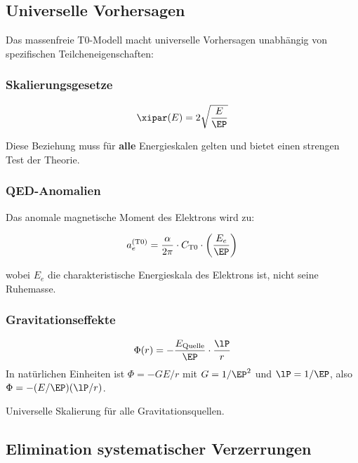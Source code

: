 	\subsection{Universelle Vorhersagen}
	\label{subsec:universal_predictions}
	
	Das massenfreie T0-Modell macht universelle Vorhersagen unabhängig von spezifischen Teilcheneigenschaften:
	
	\subsubsection{Skalierungsgesetze}
	
	\begin{equation}
		\xipar(E) = 2\sqrt{\frac{E}{\EP}}
		\label{eq:universal_scaling}
	\end{equation}
	
	Diese Beziehung muss für \textbf{alle} Energieskalen gelten und bietet einen strengen Test der Theorie.
	
	\subsubsection{QED-Anomalien}
	
	Das anomale magnetische Moment des Elektrons wird zu:
	
	\begin{equation}
		a_e^{(\text{T0})} = \frac{\alpha}{2\pi} \cdot C_{\text{T0}} \cdot \left(\frac{E_e}{\EP}\right)
		\label{eq:qed_universal}
	\end{equation}
	
	wobei $E_e$ die charakteristische Energieskala des Elektrons ist, nicht seine Ruhemasse.
	
	\subsubsection{Gravitationseffekte}
	
	\begin{equation}
		\Phi(r) = -\frac{E_{\text{Quelle}}}{\EP} \cdot \frac{\lP}{r}
		\label{eq:gravity_universal}
	\end{equation}
	In natürlichen Einheiten ist $\Phi=-GE/r$ mit $G=1/\EP^2$ und $\lP=1/\EP$, also $\Phi=-(E/\EP)(\lP/r)$.
	
	Universelle Skalierung für alle Gravitationsquellen.
	
	\subsection{Elimination systematischer Verzerrungen}
	\label{subsec:bias_elimination}
	
